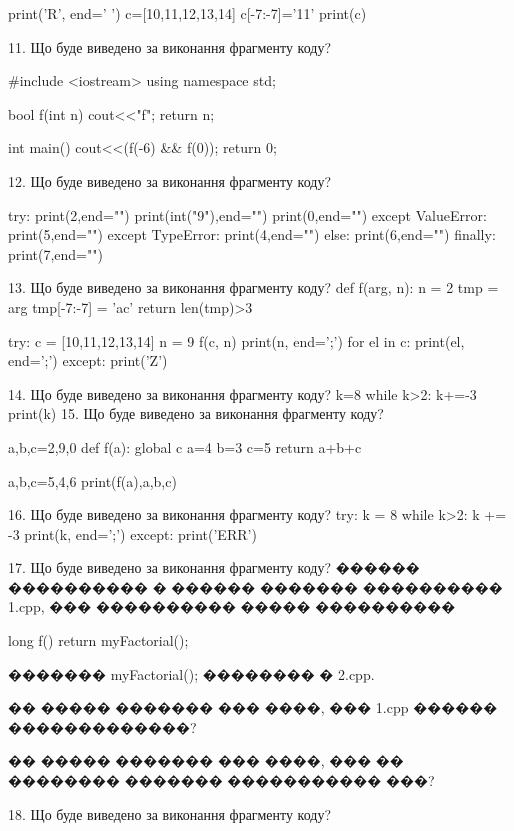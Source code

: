 \documentclass[11pt]{article}
\begin{document}
print('R', end=' ')
c=[10,11,12,13,14]
c[-7:-7]='11'
print(c)


11. Що буде виведено за виконання фрагменту коду?

#include <iostream>
using namespace std;

bool f(int n){
    cout<<"f";
    return n;
}

int main(){
    cout<<(f(-6) && f(0));
    return 0;
}

12. Що буде виведено за виконання фрагменту коду?

try:
    print(2,end="")
    print(int("9"),end="")
    print(0,end="")
except ValueError: print(5,end="")
except TypeError: print(4,end="")
else: print(6,end="")
finally: print(7,end="")


13. Що буде виведено за виконання фрагменту коду?
def f(arg, n):
    n = 2
    tmp = arg
    tmp[-7:-7] = 'ac'
    return len(tmp)>3

try:
    c = [10,11,12,13,14]
    n = 9
    f(c, n)
    print(n, end=';')
    for el in c:
        print(el, end=';')
except:
    print('Z')

14. Що буде виведено за виконання фрагменту коду?
k=8
   while k>2: k+=-3
   print(k)
15. Що буде виведено за виконання фрагменту коду?

a,b,c=2,9,0
def f(a):
global c    a=4
    b=3
    c=5
    return a+b+c

a,b,c=5,4,6
print(f(a),a,b,c)

16. Що буде виведено за виконання фрагменту коду?
try:
    k = 8
    while k>2:
        k += -3
    print(k, end=';')
except:
    print('ERR')

17. Що буде виведено за виконання фрагменту коду?
������ ���������� � ������ ������� ���������� 1.cpp, ��� ���������� ����� ����������\par
long f(){ return myFactorial();}\par
������� myFactorial(); �������� � 2.cpp.\par
�� ����� ������� ��� ����, ��� 1.cpp ������ �������������?\par\vspace{1.5cm}
�� ����� ������� ��� ����, ��� �� �������� ������� ����������� ���?\par

18. Що буде виведено за виконання фрагменту коду?
\end{document}

